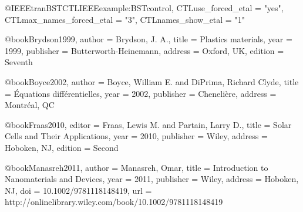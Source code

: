 


@IEEEtranBSTCTL{IEEEexample:BSTcontrol,
CTLuse_forced_etal       = "yes",
CTLmax_names_forced_etal = "3",
CTLnames_show_etal       = "1" 
}




@book{Brydson1999,
author = {Brydson, J. A.},
title = {Plastics materials},
year = {1999},
publisher = {Butterworth-Heinemann},
address = {Oxford, UK},
edition = {Seventh}
}



@book{Boyce2002,
author = {Boyce, William E. and DiPrima, Richard Clyde},
title = {Équations différentielles},
year = {2002},
publisher = {Chenelière},
address = {Montréal, QC}
}




@book{Fraas2010,
editor = {Fraas, Lewis M. and Partain, Larry D.},
title = {Solar Cells and Their Applications},
year = {2010},
publisher = {Wiley},
address = {Hoboken, NJ},
edition = {Second}
}




@book{Manasreh2011,
author = {Manasreh, Omar},
title = {Introduction to Nanomaterials and Devices},
year = {2011},
publisher = {Wiley},
address = {Hoboken, NJ},
doi = {10.1002/9781118148419},
url = {http://onlinelibrary.wiley.com/book/10.1002/9781118148419}
}



